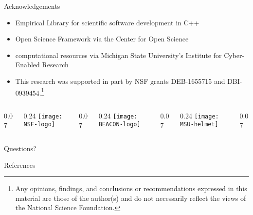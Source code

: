 \begin{frame}{Acknowledgements}
\begin{itemize}
\item Empirical Library for scientific software development in C++
\item Open Science Framework via the Center for Open Science
\item computational resources via Michigan State University's Institute for Cyber-Enabled Research
\item This research was supported in part by NSF grants DEB-1655715 and DBI-0939454.\footnote[1]{Any opinions, findings, and conclusions or recommendations expressed in this material are those of the author(s) and do not necessarily reflect the views of the National Science Foundation.}
\end{itemize}

\vfill

\newcommand{\innerspacer}{0.07\textwidth}
\newcommand{\content}{0.24\textwidth}
\newcommand{\outerspacer}{0.07\textwidth}

\begin{center}
 \begin{columns}
	\begin{column}{\outerspacer}~\end{column}
	 \begin{column}{\content}
		\texttt{[image: NSF-logo]}
 	\end{column}
  \begin{column}{\innerspacer}~\end{column}
	 \begin{column}{\content}
		\texttt{[image: BEACON-logo]}
 	\end{column}
  \begin{column}{\innerspacer}~\end{column}
 	\begin{column}{\content}
   \texttt{[image: MSU-helmet]}
 	\end{column}
 	\begin{column}{\outerspacer}~\end{column}
 \end{columns}
\end{center}

\end{frame}


\begin{frame}[standout]
  Questions?
\end{frame}

\begin{frame}[allowframebreaks]{References}

  
  \nocite{*} %
  
\end{frame}
